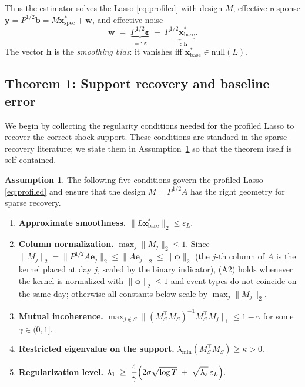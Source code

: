 \documentclass[10pt]{article} %
\theoremstyle{plain}
\theoremstyle{definition}
\newtheorem{assumption}{Assumption}
\begin{document}
Thus the estimator solves the Lasso \eqref{eq:profiled} with design
$M$, effective response
$\mathbf{y} = P^{1/2}\mathbf{b}
= M\mathbf{x}^{*}_{\mathrm{spec}} + \mathbf{w}$, and effective noise
\begin{equation}
\mathbf{w} \;=\; \underbrace{P^{1/2}\boldsymbol{\varepsilon}}_{=:\,
\tilde{\boldsymbol{\varepsilon}}}
\;+\; \underbrace{P^{1/2}\mathbf{x}^{*}_{\mathrm{base}}}_{=:\,\mathbf{h}} .
\label{eq:effective-noise}
\end{equation}
The vector $\mathbf{h}$ is the \emph{smoothing bias}: it vanishes iff
$\mathbf{x}^{*}_{\mathrm{base}} \in \mathrm{null}(L)$.

\subsection{Theorem 1: Support recovery and baseline error}

We begin by collecting the regularity conditions needed for the
profiled Lasso to recover the correct shock support. These conditions
are standard in the sparse-recovery literature; we state them in
Assumption~\ref{ass:A} so that the theorem itself is self-contained.
\begin{assumption}\label{ass:A}
The following five conditions govern the profiled Lasso
\eqref{eq:profiled} and ensure that the design $M=P^{1/2}A$ has
the right geometry for sparse recovery.
\begin{enumerate}
\item[(A1)] \textbf{Approximate smoothness.}
$\|L\mathbf{x}^{*}_{\mathrm{base}}\|_{2} \le \varepsilon_{L}$.
\item[(A2)] \textbf{Column normalization.}
$\max_{j} \|M_{j}\|_{2} \le 1$. Since $\|M_{j}\|_{2}
= \|P^{1/2}A\mathbf{e}_{j}\|_{2} \le \|A\mathbf{e}_{j}\|_{2}
\le \|\boldsymbol{\phi}\|_{2}$ (the $j$-th column of $A$ is the kernel
placed at day $j$, scaled by the binary indicator), (A2) holds
whenever the kernel is normalized with $\|\boldsymbol{\phi}\|_{2}\le 1$
and event types do not coincide on the same day; otherwise all
constants below scale by $\max_{j}\|M_{j}\|_{2}$.
\item[(A3)] \textbf{Mutual incoherence.}
$\max_{j\notin S}
\bigl\| (M_{S}^{\top}M_{S})^{-1} M_{S}^{\top} M_{j} \bigr\|_{1}
\le 1-\gamma$ for some $\gamma \in (0,1]$.
\item[(A4)] \textbf{Restricted eigenvalue on the support.}
$\lambda_{\min}(M_{S}^{\top}M_{S}) \ge \kappa > 0$.
\item[(A5)] \textbf{Regularization level.}
$\displaystyle
\lambda_{1} \;\ge\; \frac{4}{\gamma}\Bigl(
2\sigma\sqrt{\log T} \;+\; \sqrt{\lambda_{s}}\,\varepsilon_{L}\Bigr).$
\end{enumerate}
\end{assumption}
\end{document}
